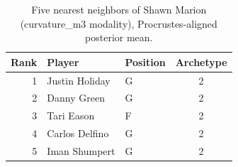 \begin{table}[htbp]
  \centering\small
  \begin{tabular}{rllc}
    \toprule
    Rank & Player & Position & Archetype \\
    \midrule
    1 & Justin Holiday & G & 2 \\
    2 & Danny Green & G & 2 \\
    3 & Tari Eason & F & 2 \\
    4 & Carlos Delfino & G & 2 \\
    5 & Iman Shumpert & G & 2 \\
    \bottomrule
  \end{tabular}
  \caption{Five nearest neighbors of Shawn Marion (curvature_m3 modality), Procrustes-aligned posterior mean.}
  \label{tab:Shawn_Marion_neighbors_curvature_m3}
\end{table}

